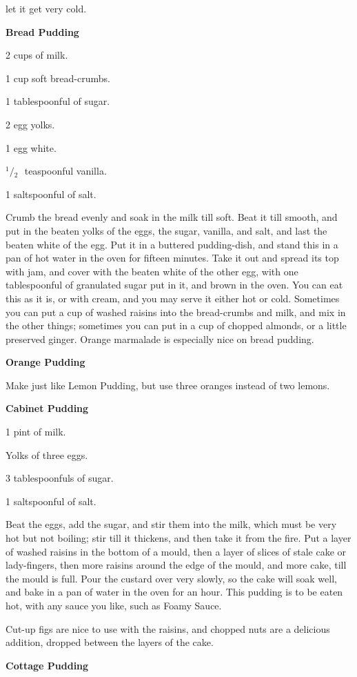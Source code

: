 \documentclass[11pt]{book}
\newcommand{\indpar}{\par\noindent\hspace*{\parindent}}
\newcommand{\ingredient}{\indpar}
\newcommand{\instruction}{\indpar}
\newcommand{\OneHalf}{\ensuremath{{}^1\!\!/\!{}_2\mbox{\ }}}
\newenvironment{RecipeTitle}{\medskip\begin{center}\large\bf }{\end{center}\smallskip}
\begin{document}
let it get very cold.
\begin{RecipeTitle}
 Bread Pudding\label{bread_pudding}
\end{RecipeTitle}
\ingredient  2 cups of milk.
\ingredient  1 cup soft bread-crumbs.
\ingredient  1 tablespoonful of sugar.
\ingredient  2 egg yolks.
\ingredient  1 egg white.
\ingredient  \OneHalf teaspoonful vanilla.
\ingredient  1 saltspoonful of salt.
\instruction  Crumb the bread evenly and soak in the milk till soft.  Beat
it till smooth, and put in the beaten yolks of the eggs, the
sugar, vanilla, and salt, and last the beaten white of the
egg.  Put it in a buttered pudding-dish, and stand this in a
pan of hot water in the oven for fifteen minutes.  Take it out
and spread its top with jam, and cover with the beaten white
of the other egg, with one tablespoonful of granulated sugar
put in it, and brown in the oven.  You can eat this as it is,
or with cream, and you may serve it either hot or cold.
  Sometimes you can put a cup of washed raisins into the
bread-crumbs and milk, and mix in the other things; sometimes
you can put in a cup of chopped almonds, or a little preserved
ginger.  Orange marmalade is especially nice on bread pudding.
\begin{RecipeTitle}
Orange Pudding\label{orange_pudding}
\end{RecipeTitle}
\instruction  Make just like Lemon Pudding, but use three oranges instead
of two lemons.
\begin{RecipeTitle}
Cabinet Pudding\label{cabinet_pudding}
\end{RecipeTitle}
\ingredient  1 pint of milk.
\ingredient  Yolks of three eggs.
\ingredient  3 tablespoonfuls of sugar.
\ingredient  1 saltspoonful of salt.
\instruction  Beat the eggs, add the sugar, and stir them into the milk,
which must be very hot but not boiling; stir till it thickens,
and then take it from the fire.  Put a layer of washed raisins
in the bottom of a mould, then a layer of slices of stale cake
or lady-fingers, then more raisins around the edge of the
mould, and more cake, till the mould is full.  Pour the
custard over very slowly, so the cake will soak well, and bake
in a pan of water in the oven for an hour.  This pudding is to
be eaten hot, with any sauce you like, such as Foamy Sauce.
\instruction  Cut-up figs are nice to use with the raisins, and chopped
nuts are a delicious addition, dropped between the layers of
the cake.
\begin{RecipeTitle}
Cottage Pudding\label{cottage_pudding}
\end{RecipeTitle}
\end{document}
